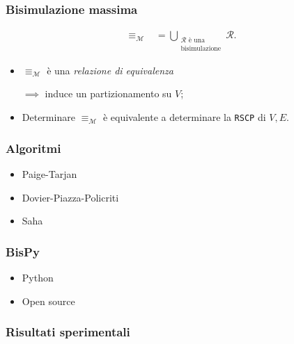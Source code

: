 \documentclass{beamer}
\begin{document}
\begin{frame}
    \frametitle{Bisimulazione massima}


    \begin{gather*}
        \equiv_\mathcal{M} \,\,\,\,\,= \bigcup_{\substack{\mathcal{R} \text{ è una}\\\text{bisimulazione}}} \mathcal{R}.
    \end{gather*}

    \begin{itemize}
        \item $\equiv_\mathcal{M}$ è una \emph{relazione di equivalenza}

        $\implies$ induce un partizionamento su $V$;
        \item Determinare $\equiv_\mathcal{M}$ è equivalente a determinare la \texttt{RSCP} di $V,E$.
    \end{itemize}
\end{frame}

\begin{frame}
    \frametitle{Algoritmi}
    \begin{itemize}
        \item Paige-Tarjan
        \item Dovier-Piazza-Policriti
        \item Saha
    \end{itemize}
\end{frame}

\begin{frame}
    \frametitle{BisPy}
    \begin{itemize}
        \item Python
        \item Open source
    \end{itemize}
\end{frame}

\begin{frame}
    \frametitle{Risultati sperimentali}
\end{frame}
\end{document}
